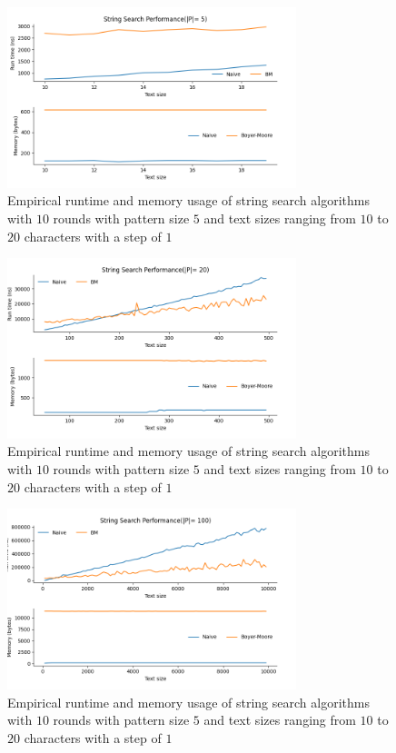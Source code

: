 \documentclass[11pt, letterpaper]{article}
\begin{document}
\begin{figure}[H] \centering
    \includegraphics[width=0.75\textwidth]{time_mem/r1.png}
    \caption{Empirical runtime and memory usage of string search algorithms with $10$ rounds with pattern size $5$ and text sizes ranging from $10$ to $20$ characters with a step of $1$}
    \label{timeandmemr1}
\end{figure}

\begin{figure}[H] \centering
    \includegraphics[width=0.75\textwidth]{time_mem/r2.png}
    \caption{Empirical runtime and memory usage of string search algorithms with $10$ rounds with pattern size $5$ and text sizes ranging from $10$ to $20$ characters with a step of $1$}
    \label{timeandmemr2}
\end{figure}

\begin{figure}[H] \centering
    \includegraphics[width=0.75\textwidth]{time_mem/r3.png}
    \caption{Empirical runtime and memory usage of string search algorithms with $10$ rounds with pattern size $5$ and text sizes ranging from $10$ to $20$ characters with a step of $1$}
    \label{timeandmemr3}
\end{figure}
\end{document}
